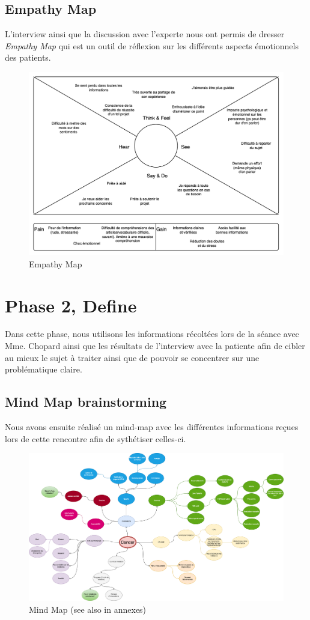 \documentclass{ReportTemplate}
\begin{document}
\section{Empathy Map}
L'interview ainsi que la discussion avec l'experte nous ont permis de dresser
\textit{Empathy Map} qui est un outil de réflexion sur les différents aspects
émotionnels des patients.
\begin{figure}[H]
    \centering
    \includegraphics[width=\textwidth]{imageSources/EmpathyMap.png}
    \caption{Empathy Map}
    \label{fig:EmpathyMap}
\end{figure}
\chapter{Phase 2, Define}
Dans cette phase, nous utilisons les informations récoltées lors de la séance
avec Mme. Chopard ainsi que les résultats de l'interview avec la patiente afin
de cibler au mieux le sujet à traiter ainsi que de pouvoir se concentrer sur une
problématique claire.
\section{Mind Map brainstorming}
Nous avons ensuite réalisé un mind-map avec les différentes informations reçues
lors de cette rencontre afin de sythétiser celles-ci.
\begin{figure}[H]
    \centering
    \includegraphics[width=\textwidth]{imageSources/PI-Expert-MM.png}
    \caption{Mind Map (see also in annexes)}
    \label{fig:MindMap}
\end{figure}
\end{document}
